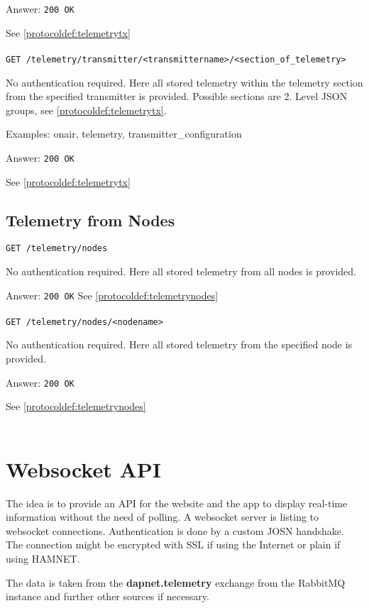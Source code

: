 Answer:
\texttt{200 OK}

See \ref{protocoldef:telemetrytx}\\\\

\texttt{GET /telemetry/transmitter/<transmittername>/<section\_of\_telemetry>}

No authentication required. Here all stored telemetry within the telemetry
section from the specified transmitter is provided. Possible sections are 2.
Level JSON groups, see \ref{protocoldef:telemetrytx}.

Examples: onair, telemetry, transmitter\_configuration

Answer:
\texttt{200 OK}

See \ref{protocoldef:telemetrytx}

\subsection{Telemetry from Nodes}

\texttt{GET /telemetry/nodes}

No authentication required. Here all stored telemetry from all nodes is provided.

Answer:
\texttt{200 OK}
See \ref{protocoldef:telemetrynodes}\\\\

\texttt{GET /telemetry/nodes/<nodename>}

No authentication required. Here all stored telemetry from the specified node is provided.

Answer:
\texttt{200 OK}

See \ref{protocoldef:telemetrynodes}\\\\


\section{Websocket API}
\label{protocoldef:websocketapi}
The idea is to provide an API for the website and the app to display real-time
information without the need of polling. A websocket server is listing to
websocket connections. Authentication is done by a custom JOSN handshake. The
connection might be encrypted with SSL if using the Internet or plain if using
HAMNET.

The data is taken from the \textbf{dapnet.telemetry} exchange
from the RabbitMQ instance and further other sources if necessary.

